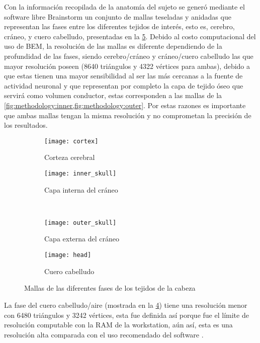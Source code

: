 Con la información recopilada de la anatomía del sujeto se generó mediante el software libre Brainstorm \cite{brain2011} un conjunto de mallas teseladas y anidadas que representan las fases entre los diferentes tejidos de interés, esto es, cerebro, cráneo, y cuero cabelludo, presentadas en la \cref{fig:methodology:meshes}.
Debido al costo computacional del uso de BEM, la resolución de las mallas es diferente dependiendo de la profundidad de las fases, siendo cerebro/cráneo y cráneo/cuero cabelludo las que mayor resolución poseen (8640 triángulos y 4322 vértices para ambas), debido a que estas tienen una mayor sensibilidad al ser las más cercanas a la fuente de actividad neuronal y que representan por completo la capa de tejido óseo que servirá como volumen conductor, estas corresponden a las mallas de la \cref{fig:methodology:inner,fig:methodology:outer}.
Por estas razones es importante que ambas mallas tengan la misma resolución y no comprometan la precisión de los resultados. 

\begin{figure}[tbp]
	\centering
	\begin{subfigure}{0.45\textwidth}
		\texttt{[image: cortex]}
		\caption{Corteza cerebral}
		\label{fig:methodology:cortex}
		\vspace{0.1cm}
	\end{subfigure}\hfill
	\begin{subfigure}{0.45\textwidth}
		\texttt{[image: inner\_skull]}
		\caption{Capa interna del cráneo}
		\label{fig:methodology:inner}
		\vspace{0.1cm}
	\end{subfigure}\\
	\begin{subfigure}{0.45\textwidth}
		\texttt{[image: outer\_skull]}
		\caption{Capa externa del cráneo}
		\label{fig:methodology:outer}
	\end{subfigure}\hfill
	\begin{subfigure}{0.45\textwidth}
		\texttt{[image: head]}
		\caption{Cuero cabelludo}
		\label{fig:methodology:head}
	\end{subfigure}
	\caption{Mallas de las diferentes fases de los tejidos de la cabeza}
	\label{fig:methodology:meshes}
\end{figure}

La fase del cuero cabelludo/aire (mostrada en la \cref{fig:methodology:head}) tiene una resolución menor con 6480 triángulos y 3242 vértices, esta fue definida así porque fue el límite de resolución computable con la RAM de la workstation, aún así, esta es una resolución alta comparada con el uso recomendado del software \cite{tadelMEGEEGGroup2019a}.

